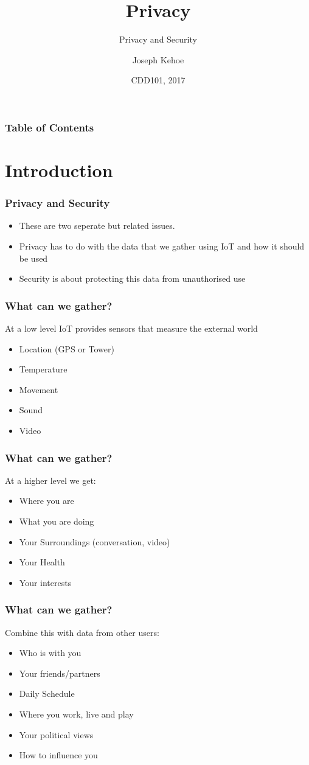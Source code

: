 \documentclass{beamer}
\title[Privacy] %
{Privacy}
\subtitle{Privacy and Security}
\author[Dr. Joseph Kehoe] %
{Joseph Kehoe\inst{1}}
\institute[IT Carlow] %
{
	\inst{1}%
	Department of Computing and Networking\\
	Institute of Technology Carlow
}
\date[ITC 2017] %
{CDD101, 2017}
\begin{document}
 
\frame{\titlepage}
 
 
 
 \begin{frame}
 	\frametitle{Table of Contents}
 	\tableofcontents
 \end{frame}
 
 
 \section{Introduction}
 

  \begin{frame}
  	\frametitle{Privacy and Security}
  	\begin{itemize}
  	\item These are two seperate but related issues.
  	\item Privacy has to do with the data that we gather using IoT and how it should be used
  	\item Security is about protecting this data from unauthorised use
  	\end{itemize}
  	
  \end{frame}

  \begin{frame}
  	\frametitle{What can we gather?}
  	At a low level IoT provides sensors that measure the external world
  	\begin{itemize}
  		\item Location (GPS or Tower)
  		\item Temperature
  		\item Movement
  		\item Sound
  		\item Video
  	\end{itemize}
  \end{frame}
    \begin{frame}
  	\frametitle{What can we gather?}
  	At a higher level we get:
  	\begin{itemize}
  		\item Where you are
  		\item What you are doing
  		\item Your Surroundings (conversation, video)
  		\item Your Health
  		\item Your interests
  	\end{itemize}
  \end{frame}
      \begin{frame}
  	\frametitle{What can we gather?}
  	Combine this with data from other users:
  	\begin{itemize}
  		\item Who is with you
  		\item Your friends/partners
  		\item Daily Schedule
  		\item Where you work, live and play
  		\item Your political views
  		\item How to influence you
  	\end{itemize}
  \end{frame}
  
\end{document}
